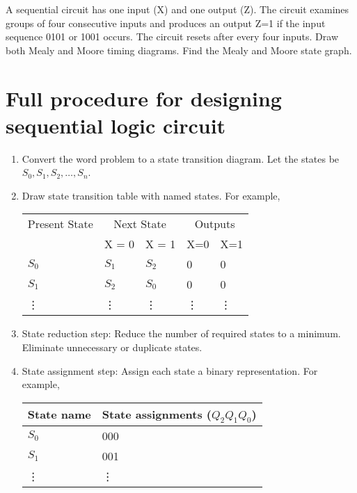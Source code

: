 \begin{prob}
  A sequential circuit has one input (X) and one output (Z). The circuit
  examines groups of four consecutive inputs and produces an output Z=1 if the
  input sequence 0101 or 1001 occurs. The circuit resets after every four
  inputs. Draw both Mealy and Moore timing diagrams. Find the Mealy and Moore state graph.
\end{prob}
\vspace{20em}

\section{Full procedure for designing sequential logic circuit}

\begin{enumerate}
  \item Convert the word problem to a state transition diagram. Let the states
    be $S_0, S_1, S_2, \dots, S_n$.
  \item Draw state transition table with named states. For example,\\
    \begin{tabular}{lllll}
      \toprule
      Present State & \multicolumn{2}{c}{Next State} & \multicolumn{2}{c}{Outputs} \\
      &  X = 0 & X = 1& X=0 & X=1  \\
      \midrule
       $S_0$ & $S_1$ & $S_2$ & 0 & 0\\
      $S_1$ & $S_2$ & $S_0$ & 0 & 0\\
      \vdots & \vdots & \vdots & \vdots & \vdots  \\
      \bottomrule
    \end{tabular}
   \item State reduction step: Reduce the number of required states to a
     minimum. Eliminate unnecessary or duplicate states.
   \item State assignment step: Assign each state a binary representation. For
     example, \\
     \begin{tabular}{ll}
       \toprule
       State name & State assignments ($Q_2 Q_1 Q_0$)\\
       \midrule
       $S_0$ & 000 \\
       $S_1$ & 001 \\
       \vdots & \vdots\\
       \bottomrule
     \end{tabular}
     

\end{enumerate}
